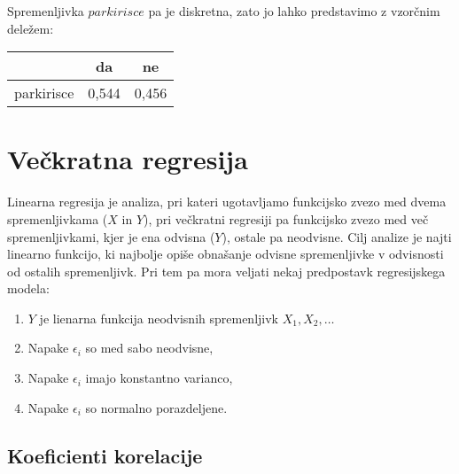 \documentclass[a4paper, 12pt]{article}
\begin{document}
Spremenljivka $ parkirisce $ pa je diskretna, zato jo lahko predstavimo z
vzorčnim deležem:

\begin{center}
\begin{tabular}{ c|cc }
	& da & ne \\
	\hline
	parkirisce & 0,544 & 0,456 \\
\end{tabular}
\end{center}


\section{Večkratna regresija}

Linearna regresija je analiza, pri kateri ugotavljamo funkcijsko zvezo med
dvema spremenljivkama ($ X $ in $ Y $), pri večkratni regresiji pa funkcijsko
zvezo med več spremenljivkami, kjer je ena odvisna ($ Y $), ostale pa neodvisne.
Cilj analize je najti linearno funkcijo, ki najbolje opiše obnašanje odvisne
spremenljivke v odvisnosti od ostalih spremenljivk. Pri tem pa mora veljati
nekaj predpostavk regresijskega modela:
\begin{enumerate}
	\item $ Y $ je lienarna funkcija neodvisnih spremenljivk $ X_{1}, X_{2}, \dots $
	\item Napake $ \epsilon_{i} $ so med sabo neodvisne,
	\item Napake $ \epsilon_{i} $ imajo konstantno varianco,
	\item Napake $ \epsilon_{i} $ so normalno porazdeljene.
\end{enumerate}

\subsection{Koeficienti korelacije}
\end{document}
